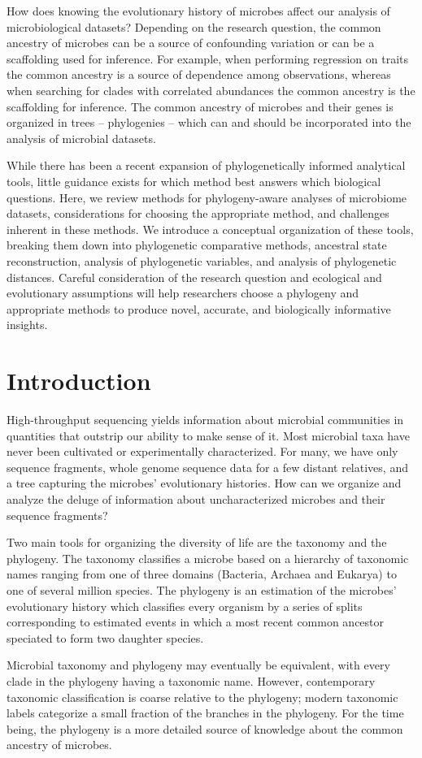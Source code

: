 \glsresetall
How does knowing the evolutionary history of microbes affect our analysis of microbiological datasets? Depending on the research question, the common ancestry of microbes can be a source of confounding variation or can be a scaffolding used for inference. For example, when performing regression on traits the common ancestry is a source of dependence among observations, whereas when searching for clades with correlated abundances the common ancestry is the scaffolding for inference. The common ancestry of microbes and their genes is organized in trees – phylogenies – which can and should be incorporated into the analysis of microbial datasets.\par
While there has been a recent expansion of phylogenetically informed analytical tools, little guidance exists for which method best answers which biological questions. Here, we review methods for phylogeny-aware analyses of microbiome datasets, considerations for choosing the appropriate method, and challenges inherent in these methods.  We introduce a conceptual organization of these tools, breaking them down into phylogenetic comparative methods, ancestral state reconstruction, analysis of phylogenetic variables, and analysis of phylogenetic distances. Careful consideration of the research question and ecological and evolutionary assumptions will help researchers choose a phylogeny and appropriate methods to produce novel, accurate, and biologically informative insights.
\section{Introduction}
High-throughput sequencing yields information about microbial communities in quantities that outstrip our ability to make sense of it. Most microbial taxa have never been cultivated or experimentally characterized. For many, we have only sequence fragments, whole genome sequence data for a few distant relatives, and a tree capturing the microbes' evolutionary histories. How can we organize and analyze the deluge of information about uncharacterized microbes and their sequence fragments?\par
Two main tools for organizing the diversity of life are the taxonomy and the phylogeny. The taxonomy classifies a microbe based on a hierarchy of taxonomic names ranging from one of three domains (Bacteria, Archaea and Eukarya) to one of several million species. The phylogeny is an estimation of the microbes' evolutionary history which classifies every organism by a series of splits corresponding to estimated events in which a most recent common ancestor speciated to form two daughter species.\par
Microbial taxonomy and phylogeny may eventually be equivalent, with every clade in the phylogeny having a taxonomic name. However, contemporary taxonomic classification is coarse relative to the phylogeny; modern taxonomic labels categorize a small fraction of the branches in the phylogeny. For the time being, the phylogeny is a more detailed source of knowledge about the common ancestry of microbes.\par


